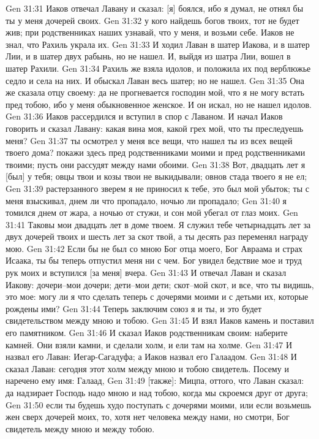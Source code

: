Gen 31:31  Иаков отвечал Лавану и сказал: [я] боялся, ибо я думал, не отнял бы ты у меня дочерей своих.
Gen 31:32  у кого найдешь богов твоих, тот не будет жив; при родственниках наших узнавай, что у меня, и возьми себе. Иаков не знал, что Рахиль украла их.
Gen 31:33  И ходил Лаван в шатер Иакова, и в шатер Лии, и в шатер двух рабынь, но не нашел. И, выйдя из шатра Лии, вошел в шатер Рахили.
Gen 31:34  Рахиль же взяла идолов, и положила их под верблюжье седло и села на них. И обыскал Лаван весь шатер; но не нашел.
Gen 31:35  Она же сказала отцу своему: да не прогневается господин мой, что я не могу встать пред тобою, ибо у меня обыкновенное женское. И он искал, но не нашел идолов.
Gen 31:36  Иаков рассердился и вступил в спор с Лаваном. И начал Иаков говорить и сказал Лавану: какая вина моя, какой грех мой, что ты преследуешь меня?
Gen 31:37  ты осмотрел у меня все вещи, что нашел ты из всех вещей твоего дома? покажи здесь пред родственниками моими и пред родственниками твоими; пусть они рассудят между нами обоими.
Gen 31:38  Вот, двадцать лет я [был] у тебя; овцы твои и козы твои не выкидывали; овнов стада твоего я не ел;
Gen 31:39  растерзанного зверем я не приносил к тебе, это был мой убыток; ты с меня взыскивал, днем ли что пропадало, ночью ли пропадало;
Gen 31:40  я томился днем от жара, а ночью от стужи, и сон мой убегал от глаз моих.
Gen 31:41  Таковы мои двадцать лет в доме твоем. Я служил тебе четырнадцать лет за двух дочерей твоих и шесть лет за скот твой, а ты десять раз переменял награду мою.
Gen 31:42  Если бы не был со мною Бог отца моего, Бог Авраама и страх Исаака, ты бы теперь отпустил меня ни с чем. Бог увидел бедствие мое и труд рук моих и вступился [за меня] вчера.
Gen 31:43  И отвечал Лаван и сказал Иакову: дочери--мои дочери; дети--мои дети; скот--мой скот, и все, что ты видишь, это мое: могу ли я что сделать теперь с дочерями моими и с детьми их, которые рождены ими?
Gen 31:44  Теперь заключим союз я и ты, и это будет свидетельством между мною и тобою.
Gen 31:45  И взял Иаков камень и поставил его памятником.
Gen 31:46  И сказал Иаков родственникам своим: наберите камней. Они взяли камни, и сделали холм, и ели там на холме.
Gen 31:47  И назвал его Лаван: Иегар-Сагадуфа; а Иаков назвал его Галаадом.
Gen 31:48  И сказал Лаван: сегодня этот холм между мною и тобою свидетель. Посему и наречено ему имя: Галаад,
Gen 31:49  [также]: Мицпа, оттого, что Лаван сказал: да надзирает Господь надо мною и над тобою, когда мы скроемся друг от друга;
Gen 31:50  если ты будешь худо поступать с дочерями моими, или если возьмешь жен сверх дочерей моих, то, хотя нет человека между нами, но смотри, Бог свидетель между мною и между тобою.
